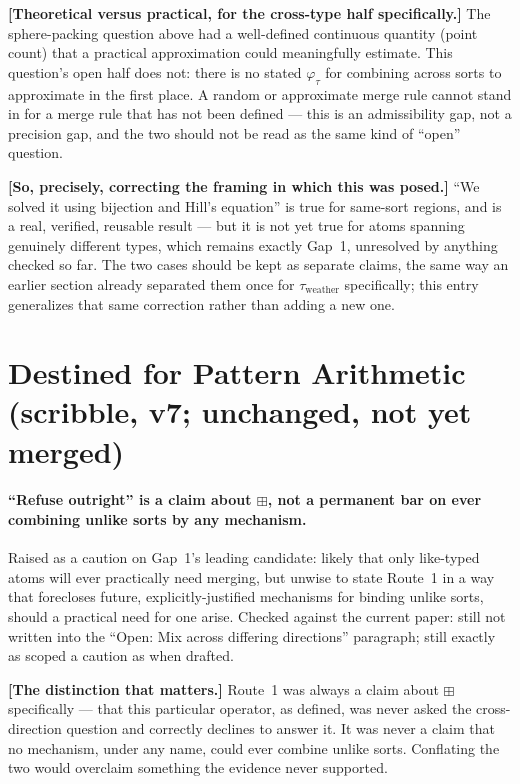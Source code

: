 \documentclass[11pt]{article}
\begin{document}
\textbf{[Theoretical versus practical, for the cross-type half
specifically.]} The sphere-packing question above had a well-defined
continuous quantity (point count) that a practical approximation could
meaningfully estimate. This question's open half does not: there is no
stated $\varphi_\tau$ for combining across sorts to approximate in the
first place. A random or approximate merge rule cannot stand in for a
merge rule that has not been defined --- this is an admissibility gap,
not a precision gap, and the two should not be read as the same kind
of ``open'' question.

\textbf{[So, precisely, correcting the framing in which this was
posed.]} ``We solved it using bijection and Hill's equation'' is true
for same-sort regions, and is a real, verified, reusable result ---
but it is not yet true for atoms spanning genuinely different types,
which remains exactly Gap~1, unresolved by anything checked so far.
The two cases should be kept as separate claims, the same way an
earlier section already separated them once for $\tau_{\text{weather}}$
specifically; this entry generalizes that same correction rather than
adding a new one.

\section{Destined for Pattern Arithmetic (scribble, v7; unchanged, not
yet merged)}

\paragraph{``Refuse outright'' is a claim about $\boxplus$, not a
permanent bar on ever combining unlike sorts by any mechanism.}
Raised as a caution on Gap~1's leading candidate: likely that only
like-typed atoms will ever practically need merging, but unwise to
state Route~1 in a way that forecloses future, explicitly-justified
mechanisms for binding unlike sorts, should a practical need for one
arise. Checked against the current paper: still not written into the
``Open: Mix across differing directions'' paragraph; still exactly as
scoped a caution as when drafted.

\textbf{[The distinction that matters.]} Route~1 was always a claim
about $\boxplus$ specifically --- that this particular operator, as
defined, was never asked the cross-direction question and correctly
declines to answer it. It was never a claim that no mechanism, under
any name, could ever combine unlike sorts. Conflating the two would
overclaim something the evidence never supported.
\end{document}
